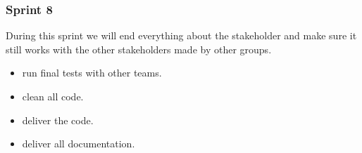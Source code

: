 \subsubsection{Sprint 8}
During this sprint we will end everything about the stakeholder and make sure it still works with the other stakeholders made by other groups.
\begin{itemize}
	\item run final tests with other teams.
	\item clean all code.
	\item deliver the code.
	\item deliver all documentation.
\end{itemize}
\newpage
